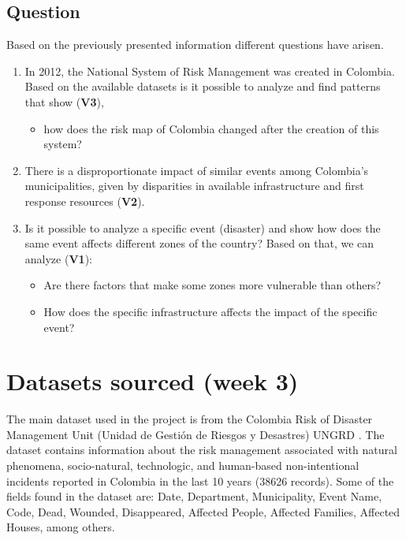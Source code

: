 \documentclass[11pt]{article}
\begin{document}
\subsection{Question}

Based on the previously presented information different questions have arisen.

\begin{enumerate}


\item{In 2012, the National System of Risk Management was created in Colombia. Based on the available datasets is it possible to analyze and find patterns that show (\textbf{V3}),
\begin{itemize}
\item how does the risk map of Colombia changed after the creation of this system?
\end{itemize}
}


\item{There is a disproportionate impact of similar events among Colombia's municipalities, given by disparities in available infrastructure and first response resources  (\textbf{V2}).}


\item{Is it possible to analyze a specific event (disaster) and show how does the same event  affects different zones of the country? Based on that, we can analyze (\textbf{V1}):
\begin{itemize}
\item Are there factors that make some zones more vulnerable than others?
\item How does the specific infrastructure affects the impact of the specific event?
\end{itemize}
}
\end{enumerate}



\section{Datasets sourced (week 3)}
\label{sec:app}

The main dataset used in the project is from the Colombia Risk of Disaster Management Unit (Unidad de Gesti\'{o}n de Riesgos y Desastres) UNGRD \cite{datasetUNGRD}. The dataset contains information about  the risk management associated with natural phenomena, socio-natural, technologic, and human-based non-intentional incidents reported in Colombia in the last 10 years (38626 records). Some of the fields found in the dataset are: Date, Department, Municipality, Event Name, Code, Dead, Wounded, Disappeared, Affected People, Affected Families, Affected Houses, among others.
\end{document}
